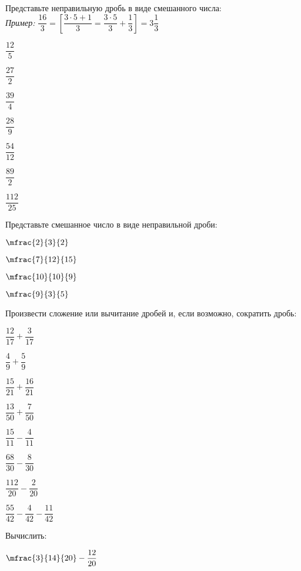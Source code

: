\begin{listofex}
	\item Представьте неправильную дробь в виде смешанного числа:\\[1em]
	\textit{Пример:} \( \dfrac{16}{3}=\left[ \dfrac{3\cdot5+1}{3}=\dfrac{3\cdot5}{3}+\dfrac{1}{3} \right]=3\dfrac{1}{3} \)\\
	\begin{enumcols}[itemcolumns=7]
		\item \( \dfrac{12}{5} \)
		\item \( \dfrac{27}{2} \)
		\item \( \dfrac{39}{4} \)
		\item \( \dfrac{28}{9} \)
		\item \( \dfrac{54}{12} \)
		\item \( \dfrac{89}{2} \)
		\item \( \dfrac{112}{25} \)
	\end{enumcols}
	\item Представьте смешанное число в виде неправильной дроби:
	\begin{enumcols}[itemcolumns=4]
		\item \( \mfrac{2}{3}{2} \)
		\item \( \mfrac{7}{12}{15} \)
		\item \( \mfrac{10}{10}{9} \)
		\item \( \mfrac{9}{3}{5} \)
	\end{enumcols}
	\item Произвести сложение или вычитание дробей и, если возможно, сократить дробь:
	\begin{enumcols}[itemcolumns=4]
		\item \( \dfrac{12}{17}+\dfrac{3}{17} \)
		\item \( \dfrac{4}{9}+\dfrac{5}{9} \)
		\item \( \dfrac{15}{21}+\dfrac{16}{21} \)
		\item \( \dfrac{13}{50}+\dfrac{7}{50} \)
		\item \( \dfrac{15}{11}-\dfrac{4}{11} \)
		\item \( \dfrac{68}{30}-\dfrac{8}{30} \)
		\item \( \dfrac{112}{20}-\dfrac{2}{20} \)
		\item \( \dfrac{55}{42}-\dfrac{4}{42}-\dfrac{11}{42} \)
	\end{enumcols}
	\item Вычислить:
	\begin{enumcols}[itemcolumns=4]
		\item \( \mfrac{3}{14}{20}-\dfrac{12}{20} \)

\end{enumcols}
\end{listofex}
